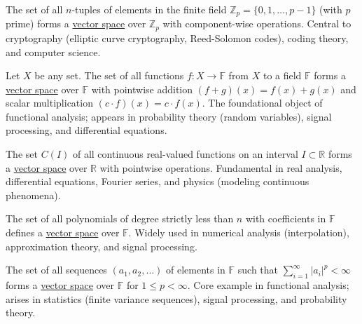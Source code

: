   \begin{example}[$\mathbb{Z}_p^n$]
    \label{ex:zpn}
    The set of all $n$-tuples of elements in the finite field $\mathbb{Z}_p = \{0, 1, \dots, p-1\}$ (with $p$ prime) forms a \hyperref[def:vector-space]{vector space} over $\mathbb{Z}_p$ with component-wise operations. Central to cryptography (elliptic curve cryptography, Reed-Solomon codes), coding theory, and computer science.
  \end{example}

  \begin{example}
    \label{ex:function-space}
    Let $X$ be any set. The set of all functions $f: X \to \mathbb{F}$ from $X$ to a field $\mathbb{F}$ forms a \hyperref[def:vector-space]{vector space} over $\mathbb{F}$ with pointwise addition $(f+g)(x) = f(x) + g(x)$ and scalar multiplication $(c \cdot f)(x) = c \cdot f(x)$. The foundational object of functional analysis; appears in probability theory (random variables), signal processing, and differential equations.
  \end{example}

  \begin{example}
    \label{ex:continuous-functions}
    The set $C(I)$ of all continuous real-valued functions on an interval $I \subset \mathbb{R}$ forms a \hyperref[def:vector-space]{vector space} over $\mathbb{R}$ with pointwise operations. Fundamental in real analysis, differential equations, Fourier series, and physics (modeling continuous phenomena).
  \end{example}

  \begin{example}
    \label{ex:polynomials-of-finite-degree}
    The set of all polynomials of degree strictly less than $n$ with coefficients in $\mathbb{F}$ defines a \hyperref[def:vector-space]{vector space} over $\mathbb{F}$. Widely used in numerical analysis (interpolation), approximation theory, and signal processing.
  \end{example}

  \begin{example}
    \label{ex:sequence-space-ellp}
    The set of all sequences $(a_1, a_2, \dots)$ of elements in $\mathbb{F}$ such that $\sum_{i=1}^\infty |a_i|^p < \infty$ forms a \hyperref[def:vector-space]{vector space} over $\mathbb{F}$ for $1 \leq p < \infty$. Core example in functional analysis; arises in statistics (finite variance sequences), signal processing, and probability theory.
  \end{example}

